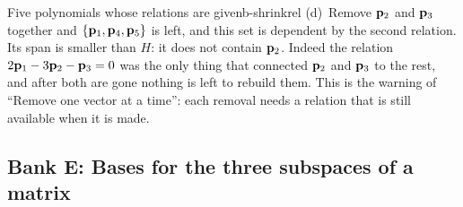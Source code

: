 \documentclass[11pt]{article}
\begin{document}
\begin{exmp}{Five polynomials whose relations are given}{b-shrinkrel}
(d)~Remove $\mathbf{p}_2$ and $\mathbf{p}_3$ together and $\{\mathbf{p}_1,\mathbf{p}_4,\mathbf{p}_5\}$ is left, and this set is dependent by the second relation. Its span is smaller than $H$: it does not contain $\mathbf{p}_2$. Indeed the relation $2\mathbf{p}_1-3\mathbf{p}_2-\mathbf{p}_3=0$ was the only thing that connected $\mathbf{p}_2$ and $\mathbf{p}_3$ to the rest, and after both are gone nothing is left to rebuild them. This is the warning of ``Remove one vector at a time'': each removal needs a relation that is still available when it is made.
\end{exmp}

\subsection*{Bank E: Bases for the three subspaces of a matrix}
\end{document}
